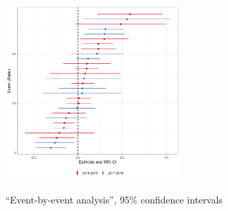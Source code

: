 \documentclass{beamer}
\begin{document}
\begin{frame}[label=event_by_event_figure2, noframenumbering]%
\begin{figure}[H]
\centering
\caption{``Event-by-event analysis'', 95\% confidence intervals} 
\label{fig:CDLZ}
    
\includegraphics[width=0.6\textwidth]{Figures_pres/CDLZ_cov.png}
       \captionsetup{justification=centering}
 \\ 
  \hyperlink{mechanism_identification}{}  
 
\end{figure}   
 
\end{frame}
\end{document}
